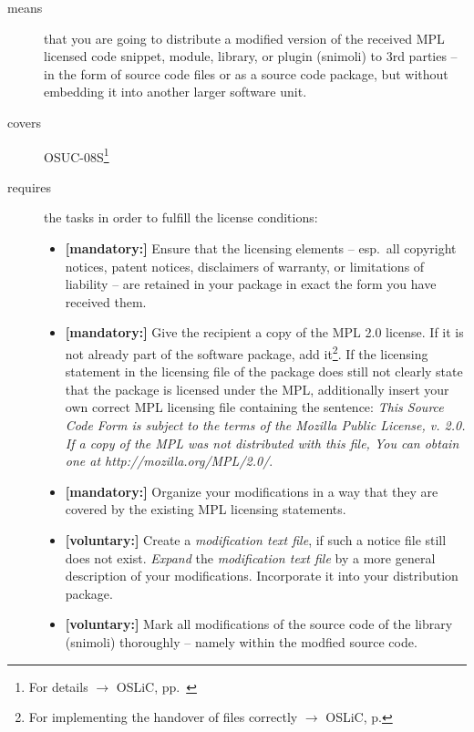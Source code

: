 \begin{description}
\item[means] that you are going to distribute a modified version of the received
MPL licensed code snippet, module, library, or plugin (snimoli) to 3rd parties
-- in the form of source code files or as a source code package, but without
embedding it into another larger software unit.
\item[covers] OSUC-08S\footnote{For details $\rightarrow$ OSLiC, pp.\
\pageref{OSUC-08S-DEF}}
\item[requires] the tasks in order to fulfill the license conditions:
\begin{itemize}

  \item \textbf{[mandatory:]} Ensure that the licensing elements -- esp.\ all
  copyright notices, patent notices, disclaimers of warranty, or limitations of
  liability -- are retained in your package in exact the form you have received
  them.
  
  \item \textbf{[mandatory:]} Give the recipient a copy of the MPL 2.0 license.
  If it is not already part of the software package, add it\footnote{For
  implementing the handover of files correctly $\rightarrow$ OSLiC, p.
  \pageref{DistributingFilesHint}}. If the licensing statement in the licensing
  file of the package does still not clearly state that the package is licensed
  under the MPL, additionally insert your own correct MPL licensing file
  containing the sentence: \emph{This Source Code Form is subject to the terms
  of the Mozilla Public License, v. 2.0. If a copy of the MPL was not
  distributed with this file, You can obtain one at
  http://mozilla.org/MPL/2.0/}.
  
  \item \textbf{[mandatory:]} Organize your modifications in a way that they are
  covered by the existing MPL licensing statements.
  
  \item \textbf{[voluntary:]} Create a \emph{modification text file}, if such a
  notice file still does not exist. \emph{Expand} the \emph{modification text
  file} by a more general description of your modifications. Incorporate it into
  your distribution package.

  \item \textbf{[voluntary:]} Mark all modifications of the source code of the
  library (snimoli) thoroughly -- namely within
  the modfied source code.
  

\end{itemize}
\end{description}
